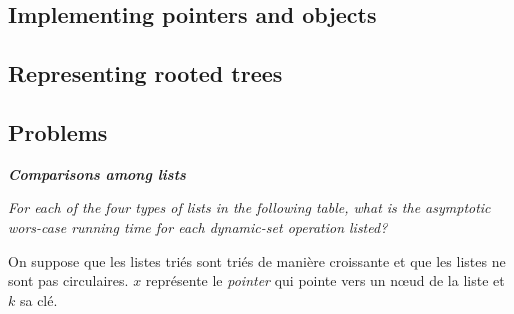 \subsection{Implementing pointers and objects}
\label{sub:implementing_pointers_and_objects}

\subsection{Representing rooted trees}
\label{sub:representing_rooted_trees}

\subsection*{Problems}

\begin{description}
     \textit{\textbf{Comparisons among lists}}

    \textit{For each of the four types of lists in the following table, what is the asymptotic wors-case running time for each dynamic-set operation listed?} 

\begin{pb}
  
    On suppose que les listes triés sont triés de manière croissante et que les listes ne sont pas circulaires. $x$ représente le \textit{pointer} qui pointe vers un nœud de la liste et $k$ sa clé. 


\end{pb}
\end{description}
